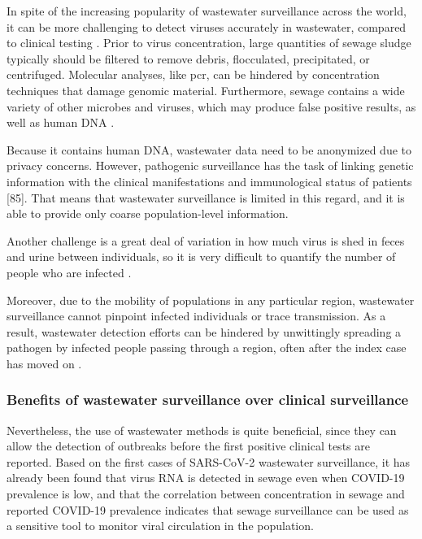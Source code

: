         In spite of the increasing popularity of wastewater surveillance across the world, it can be more challenging to detect viruses accurately in wastewater, compared to clinical testing \cite{farkas2020}. Prior to virus concentration, large quantities of sewage sludge typically should be filtered to remove debris, flocculated, precipitated, or centrifuged. Molecular analyses, like \acrshort{pcr}, can be hindered by concentration techniques that damage genomic material. Furthermore, sewage contains a wide variety of other microbes and viruses, which may produce false positive results, as well as human DNA \cite{wastewater2022}. 
        
        Because it contains human DNA, wastewater data need to be anonymized due to privacy concerns. However,  pathogenic surveillance has the task of linking genetic information with the clinical manifestations and immunological status of patients [85]. That means that wastewater surveillance is limited in this regard, and it is able to provide only coarse population-level information.
        
        Another challenge is a great deal of variation in how much virus is shed in feces and urine between individuals, so it is very difficult to quantify the number of people who are infected \cite{farkas2020}.
         
        Moreover, due to the mobility of populations in any particular region, wastewater surveillance cannot pinpoint infected individuals or trace transmission. As a result, wastewater detection efforts can be hindered by unwittingly spreading a pathogen by infected people passing through a region, often after the index case has moved on \cite{ahmed2022}. 

        \subsubsection{Benefits of wastewater surveillance over clinical surveillance} 
        
        Nevertheless, the use of wastewater methods is quite beneficial, since they can allow the detection of outbreaks before the first positive clinical tests are reported. Based on the first cases of SARS-CoV-2 wastewater surveillance, it has already been found \cite{zhang2021} that virus RNA is detected in sewage even when COVID-19 prevalence is low, and that the correlation between concentration in sewage and reported COVID-19 prevalence indicates that sewage surveillance can be used as a sensitive tool to monitor viral circulation in the population.
         
